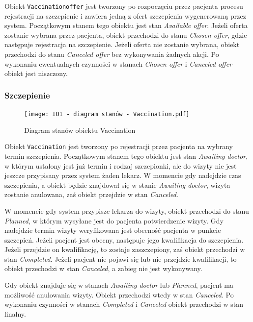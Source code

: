 \documentclass[a4paper,12pt,polish]{article}
\begin{document}
Obiekt \texttt{Vaccinationoffer} jest tworzony po rozpoczęciu przez pacjenta procesu rejestracji na szczepienie i zawiera jedną z ofert szczepienia wygenerowaną przez system. Początkowym stanem tego obiektu jest stan \textit{Available offer}. Jeżeli oferta zostanie wybrana przez pacjenta, obiekt przechodzi do stanu \textit{Chosen offer}, gdzie następuje rejestracja na szczepienie. Jeżeli oferta nie zostanie wybrana, obiekt przechodzi do stanu \textit{Canceled offer} bez wykonywania żadnych akcji. Po wykonaniu ewentualnych czynności w stanach \textit{Chosen offer} i \textit{Canceled offer} obiekt jest niszczony.

\newpage

\subsubsection{Szczepienie}
\begin{figure}[h]
    \texttt{[image: IO1 - diagram stanów - Vaccination.pdf]} 
    \caption{Diagram stanów obiektu Vaccination
    \label{fig:diagram-uml}}
\end{figure}
Obiekt \texttt{Vaccination} jest tworzony po rejestracji przez pacjenta na wybrany termin szczepienia. Początkowym stanem tego obiektu jest stan \textit{Awaiting doctor}, w którym ustalony jest już termin i rodzaj szczepionki, ale do wizyty nie jest jeszcze przypisany przez system żaden lekarz. W momencie gdy nadejdzie czas szczepienia, a obiekt będzie znajdował się w stanie \textit{Awaiting doctor}, wizyta zostanie anulowana, zaś obiekt przejdzie w stan \textit{Canceled}.


W momencie gdy system przypisze lekarza do wizyty, obiekt przechodzi do stanu \textit{Planned}, w którym wysyłane jest do pacjenta potwierdzenie wizyty. Gdy nadejdzie termin wizyty weryfikowana jest obecność pacjenta w punkcie szczepień. Jeżeli pacjent jest obecny, następuje jego kwalifikacja do szczepienia. Jeżeli  przejdzie on kwalifikację, to zostaje zaszczepiony, zaś obiekt przechodzi w stan \textit{Completed}. Jeżeli pacjent nie pojawi się lub nie przejdzie kwalifikacji, to obiekt przechodzi w stan \textit{Canceled}, a zabieg nie jest wykonywany.

Gdy obiekt znajduje się w stanach \textit{Awaiting doctor} lub \textit{Planned}, pacjent ma możliwość anulowania wizyty. Obiekt przechodzi wtedy w stan \textit{Canceled}. Po wykonaniu czynności w stanach \textit{Completed} i \textit{Canceled} obiekt przechodzi w stan finalny.

\newpage
\end{document}
